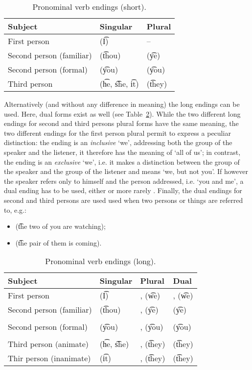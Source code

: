 \begin{table}
\centering
\caption{Pronominal verb endings (short).}
\label{tab:pronominal-verb-endings-short}
\begin{tabular}{lll}
\toprule
Subject & Singular & Plural \\
\midrule
First person & \q{} (\t{I}) & -- \\
Second person (familiar) & \q{} (\t{thou}) & \q{} (\t{ye}) \\
Second person (formal) & \q{} (\t{you}) & \q{} (\t{you}) \\
Third person & \q{} (\t{he}, \t{she}, \t{it}) & \q{} (\t{they}) \\
\bottomrule
\end{tabular}
\end{table}

Alternatively (and without any difference in meaning) the long endings can be
used. Here, dual forms exist as well (see
Table~\ref{tab:pronominal-verb-endings-long}).
While the two different long endings for second and third persons plural forms
have the same meaning, the two different endings for the first person plural
permit to express a peculiar distinction: the ending  is an
\emph{inclusive} `we', addressing both the group of the speaker and the
listener, it therefore has the meaning of `all of us'; in contrast, the ending
 is an \emph{exclusive} `we', i.e. it makes a distinction between the
group of the speaker and the group of the listener and means `we, but not you'.
If however the speaker refers only to himself and the person addressed, i.e.
`you and me', a dual ending has to be used, either  or more rarely
. Finally, the dual endings for second and third persons are used used
when two persons or things are referred to, e.g.:
\begin{itemize}
  \item {} (\t{the two of you are watching});
  \item {} (\t{the pair of them is coming}).
\end{itemize}
\begin{table}
\centering
\caption{Pronominal verb endings (long).}
\label{tab:pronominal-verb-endings-long}
\begin{tabular}{llll}
\toprule
Subject & Singular & Plural & Dual \\
\midrule
First person & \q{} (\t{I}) & \q{}, \q{} (\t{we}) & \q{},
\q{} (\t{we}) \\
Second person (familiar) & \q{} (\t{thou}) & \q{}, \q{} (\t{ye}) &
\q{} (\t{ye}) \\
\\
Second person (formal) & \q{} (\t{you}) & \q{}, \q{} (\t{you}) &
\q{} (\t{you}) \\ \\
Third person (animate) & \q{} (\t{he}, \t{she}) & \q{}, \q{}
(\t{they}) & \q{} (\t{they}) \\
Thir person (inanimate) & \q{} (\t{it}) & \q{}, \q{} (\t{they}) &
\q{} (\t{they}) \\
\bottomrule
\end{tabular}
\end{table}
